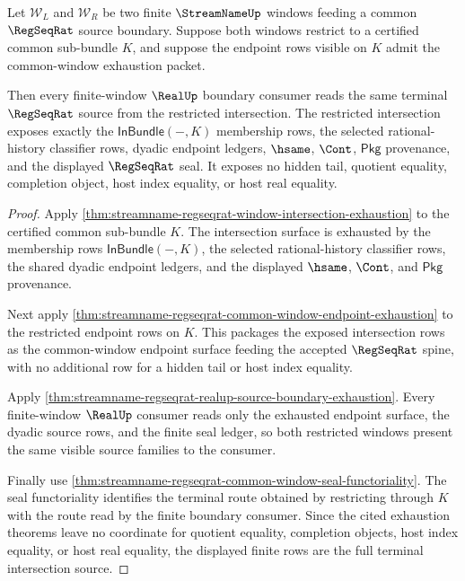 \begin{theorem}
\label{thm:streamname-regseqrat-terminal-window-intersection}
Let $\mathcal W_L$ and $\mathcal W_R$ be two finite $\StreamNameUp$ windows
feeding a common $\RegSeqRat$ source boundary. Suppose both windows restrict to
a certified common sub-bundle $K$, and suppose the endpoint rows visible on $K$
admit the common-window exhaustion packet.

Then every finite-window $\RealUp$ boundary consumer reads the same terminal
$\RegSeqRat$ source from the restricted intersection. The restricted
intersection exposes exactly the $\mathsf{InBundle}(-,K)$ membership rows, the
selected rational-history classifier rows, dyadic endpoint ledgers, $\hsame$,
$\Cont$, $\mathsf{Pkg}$ provenance, and the displayed $\RegSeqRat$ seal. It
exposes no hidden tail, quotient equality, completion object, host index
equality, or host real equality.
\end{theorem}
\begin{proof}
Apply
\autoref{thm:streamname-regseqrat-window-intersection-exhaustion} to the
certified common sub-bundle $K$. The intersection surface is exhausted by the
membership rows $\mathsf{InBundle}(-,K)$, the selected rational-history
classifier rows, the shared dyadic endpoint ledgers, and the displayed
$\hsame$, $\Cont$, and $\mathsf{Pkg}$ provenance.

Next apply
\autoref{thm:streamname-regseqrat-common-window-endpoint-exhaustion} to the
restricted endpoint rows on $K$. This packages the exposed intersection rows
as the common-window endpoint surface feeding the accepted $\RegSeqRat$ spine,
with no additional row for a hidden tail or host index equality.

Apply
\autoref{thm:streamname-regseqrat-realup-source-boundary-exhaustion}. Every
finite-window $\RealUp$ consumer reads only the exhausted endpoint surface, the
dyadic source rows, and the finite seal ledger, so both restricted windows
present the same visible source families to the consumer.

Finally use
\autoref{thm:streamname-regseqrat-common-window-seal-functoriality}. The seal
functoriality identifies the terminal route obtained by restricting through
$K$ with the route read by the finite boundary consumer. Since the cited
exhaustion theorems leave no coordinate for quotient equality, completion
objects, host index equality, or host real equality, the displayed finite rows
are the full terminal intersection source.
\end{proof}


